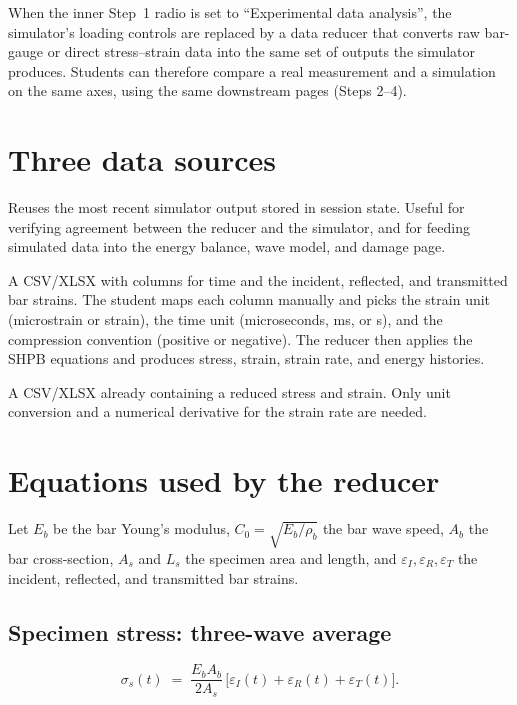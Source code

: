 \documentclass[11pt,a4paper,openany]{book}
\theoremstyle{handbook}
\newcommand{\sig}{\sigma}
\newcommand{\eps}{\varepsilon}
\newcommand{\Cz}{C_0}
\newcommand{\Ab}{A_b}
\newcommand{\As}{A_s}
\newcommand{\Ls}{L_s}
\begin{document}
When the inner Step~1 radio is set to ``Experimental data analysis'', the
simulator's loading controls are replaced by a data reducer that converts
raw bar-gauge or direct stress--strain data into the same set of outputs
the simulator produces. Students can therefore compare a real measurement
and a simulation on the same axes, using the same downstream pages (Steps
2--4).

\section{Three data sources}

\begin{description}[leftmargin=2em,style=nextline]
  \item[Latest simulator result]
    Reuses the most recent simulator output stored in session state.
    Useful for verifying agreement between the reducer and the simulator,
    and for feeding simulated data into the energy balance, wave model,
    and damage page.
  \item[Upload bar strain gauges]
    A CSV/XLSX with columns for time and the incident, reflected, and
    transmitted bar strains. The student maps each column manually and
    picks the strain unit (microstrain or strain), the time unit
    (microseconds, ms, or s), and the compression convention (positive or
    negative). The reducer then applies the SHPB equations and produces
    stress, strain, strain rate, and energy histories.
  \item[Upload direct stress--strain]
    A CSV/XLSX already containing a reduced stress and strain. Only unit
    conversion and a numerical derivative for the strain rate are
    needed.
\end{description}

\section{Equations used by the reducer}

Let $E_b$ be the bar Young's modulus, $\Cz=\sqrt{E_b/\rho_b}$ the bar
wave speed, $\Ab$ the bar cross-section, $\As$ and $\Ls$ the specimen
area and length, and $\eps_I,\eps_R,\eps_T$ the incident, reflected, and
transmitted bar strains.

\subsection*{Specimen stress: three-wave average}
\begin{equation}
  \sig_s(t) \;=\; \frac{E_b\Ab}{2\As}\,\bigl[\eps_I(t)+\eps_R(t)+\eps_T(t)\bigr].
  \label{eq:red-3wave}
\end{equation}
\end{document}
